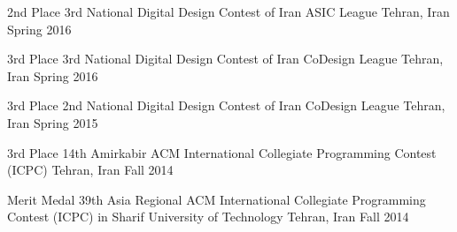 \begin{cvhonors}

  \cvhonor%
    {2nd Place} %
    {3rd National Digital Design Contest of Iran ASIC League} %
    {Tehran, Iran} %
    {Spring 2016} %

  \cvhonor%
    {3rd Place} %
    {3rd National Digital Design Contest of Iran CoDesign League} %
    {Tehran, Iran} %
    {Spring 2016} %

  \cvhonor%
    {3rd Place} %
    {2nd National Digital Design Contest of Iran CoDesign League} %
    {Tehran, Iran} %
    {Spring 2015} %

  \cvhonor%
    {3rd Place} %
    {14th Amirkabir ACM International Collegiate Programming Contest (ICPC)} %
    {Tehran, Iran} %
    {Fall 2014} %

  \cvhonor%
    {Merit Medal} %
    {39th Asia Regional ACM International Collegiate Programming Contest (ICPC) in Sharif University of Technology} %
    {Tehran, Iran} %
    {Fall 2014} %

\end{cvhonors}




